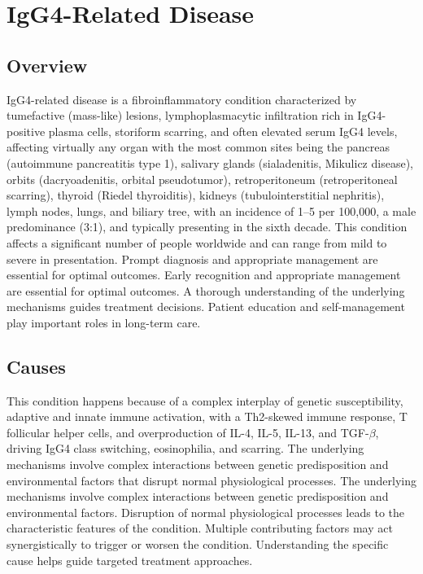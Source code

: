 \chapter{IgG4-Related Disease}
\label{sec:IgG4-Related Disease}

\section{Overview}
IgG4-related disease is a fibroinflammatory condition characterized by tumefactive (mass-like) lesions, lymphoplasmacytic infiltration rich in IgG4-positive plasma cells, storiform scarring, and often elevated serum IgG4 levels, affecting virtually any organ with the most common sites being the pancreas (autoimmune pancreatitis type 1), salivary glands (sialadenitis, Mikulicz disease), orbits (dacryoadenitis, orbital pseudotumor), retroperitoneum (retroperitoneal scarring), thyroid (Riedel thyroiditis), kidneys (tubulointerstitial nephritis), lymph nodes, lungs, and biliary tree, with an incidence of 1--5 per 100,000, a male predominance (3:1), and typically presenting in the sixth decade. This condition affects a significant number of people worldwide and can range from mild to severe in presentation. Prompt diagnosis and appropriate management are essential for optimal outcomes. Early recognition and appropriate management are essential for optimal outcomes. A thorough understanding of the underlying mechanisms guides treatment decisions. Patient education and self-management play important roles in long-term care.
\section{Causes}
This condition happens because of a complex interplay of genetic susceptibility, adaptive and innate immune activation, with a Th2-skewed immune response, T follicular helper cells, and overproduction of IL-4, IL-5, IL-13, and TGF-$\beta$, driving IgG4 class switching, eosinophilia, and scarring. The underlying mechanisms involve complex interactions between genetic predisposition and environmental factors that disrupt normal physiological processes. The underlying mechanisms involve complex interactions between genetic predisposition and environmental factors. Disruption of normal physiological processes leads to the characteristic features of the condition. Multiple contributing factors may act synergistically to trigger or worsen the condition. Understanding the specific cause helps guide targeted treatment approaches.
